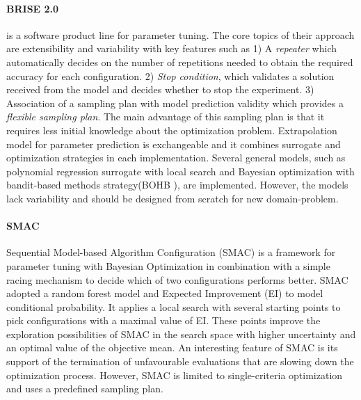 
        \paragraph{BRISE 2.0}\label{alg:BRISE} \cite{Pukhkaiev19} is a software product line for parameter tuning. The core topics of their approach are extensibility and variability with key features such as 1) A \emph{repeater} which automatically decides on the number of repetitions needed to obtain the required accuracy for each configuration. 2) \emph{Stop condition}, which validates a solution received from the model and decides whether to stop the experiment. 3) Association of a sampling plan with model prediction validity which provides a \emph{flexible sampling plan}. The main advantage of this sampling plan is that it requires less initial knowledge about the optimization problem.
        Extrapolation model for parameter prediction is exchangeable and it combines surrogate and optimization strategies in each implementation. Several general models, such as polynomial regression surrogate with local search and Bayesian optimization with bandit-based methods strategy(BOHB \cite{FalknerBOHB}), are implemented.  However, the models lack variability and should be designed from scratch for new domain-problem.

        \paragraph{SMAC} Sequential Model-based Algorithm Configuration (SMAC)\cite{HutterHL11, smac-2017} is a framework for parameter tuning with Bayesian Optimization in combination with a simple racing mechanism to decide which of two configurations performs better.
        SMAC adopted a random forest model and Expected Improvement (EI) to model conditional probability. It applies a local search with several starting points to pick configurations with a maximal value of EI. These points improve the exploration possibilities of SMAC in the search space with higher uncertainty and an optimal value of the objective mean. 
        An interesting feature of SMAC is its support of the termination of unfavourable evaluations that are slowing down the optimization process. However, SMAC is limited to single-criteria optimization and uses a predefined sampling plan.


